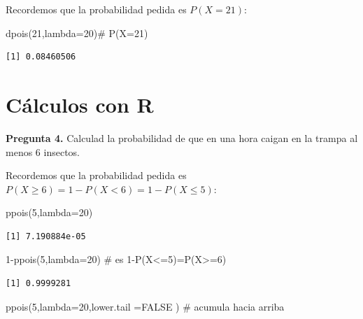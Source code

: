 \documentclass[
  letterpaper,
  DIV=11,
  numbers=noendperiod]{scrreprt}
\newenvironment{Shaded}{\begin{snugshade}}{\end{snugshade}}
\newcommand{\AttributeTok}[1]{\textcolor[rgb]{0.40,0.45,0.13}{#1}}
\newcommand{\CommentTok}[1]{\textcolor[rgb]{0.37,0.37,0.37}{#1}}
\newcommand{\ConstantTok}[1]{\textcolor[rgb]{0.56,0.35,0.01}{#1}}
\newcommand{\DecValTok}[1]{\textcolor[rgb]{0.68,0.00,0.00}{#1}}
\newcommand{\FunctionTok}[1]{\textcolor[rgb]{0.28,0.35,0.67}{#1}}
\newcommand{\NormalTok}[1]{\textcolor[rgb]{0.00,0.23,0.31}{#1}}
\newcommand{\SpecialCharTok}[1]{\textcolor[rgb]{0.37,0.37,0.37}{#1}}
\begin{document}
Recordemos que la probabilidad pedida es \(P(X=21)\):

\begin{Shaded}
\begin{Highlighting}[]
\FunctionTok{dpois}\NormalTok{(}\DecValTok{21}\NormalTok{,}\AttributeTok{lambda=}\DecValTok{20}\NormalTok{)}\CommentTok{\# P(X=21)}
\end{Highlighting}
\end{Shaded}

\begin{verbatim}
[1] 0.08460506
\end{verbatim}

\section{Cálculos con R}\label{cuxe1lculos-con-r-8}

\textbf{Pregunta 4.} Calculad la probabilidad de que en una hora caigan
en la trampa al menos 6 insectos.

Recordemos que la probabilidad pedida es
\(P(X\geq 6)=1-P(X<6)=1-P(X\leq 5)\):

\begin{Shaded}
\begin{Highlighting}[]
\FunctionTok{ppois}\NormalTok{(}\DecValTok{5}\NormalTok{,}\AttributeTok{lambda=}\DecValTok{20}\NormalTok{)}
\end{Highlighting}
\end{Shaded}

\begin{verbatim}
[1] 7.190884e-05
\end{verbatim}

\begin{Shaded}
\begin{Highlighting}[]
\DecValTok{1}\SpecialCharTok{{-}}\FunctionTok{ppois}\NormalTok{(}\DecValTok{5}\NormalTok{,}\AttributeTok{lambda=}\DecValTok{20}\NormalTok{) }\CommentTok{\# es 1{-}P(X\textless{}=5)=P(X\textgreater{}=6)}
\end{Highlighting}
\end{Shaded}

\begin{verbatim}
[1] 0.9999281
\end{verbatim}

\begin{Shaded}
\begin{Highlighting}[]
\FunctionTok{ppois}\NormalTok{(}\DecValTok{5}\NormalTok{,}\AttributeTok{lambda=}\DecValTok{20}\NormalTok{,}\AttributeTok{lower.tail =}\ConstantTok{FALSE}\NormalTok{ ) }\CommentTok{\# acumula hacia arriba }
\end{Highlighting}
\end{Shaded}
\end{document}

